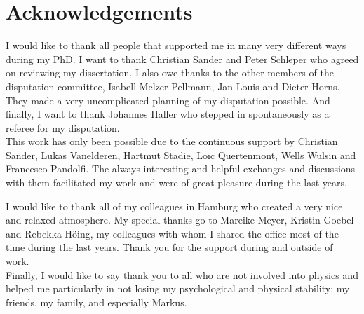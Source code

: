 \chapter*{Acknowledgements}
\vspace{1cm}

I would like to thank all people that supported me in many very different ways during my PhD.
I want to thank Christian Sander and Peter Schleper who agreed on reviewing my dissertation.
I also owe thanks to the other members of the disputation committee, Isabell Melzer-Pellmann, Jan Louis and Dieter Horns.
They made a very uncomplicated planning of my disputation possible.
And finally, I want to thank Johannes Haller who stepped in spontaneously as a referee for my disputation.\\

This work has only been possible due to the continuous support by Christian Sander, Lukas Vanelderen, Hartmut Stadie, Lo\"{i}c Quertenmont, Wells Wulsin and Francesco Pandolfi.
The always interesting and helpful exchanges and discussions with them facilitated my work and were of great pleasure during the last years.

I would like to thank all of my colleagues in Hamburg who created a very nice and relaxed atmosphere. 
My special thanks go to Mareike Meyer, Kristin Goebel and Rebekka H\"{o}ing, my colleagues with whom I shared the office most of the time during the last years. 
Thank you for the support during and outside of work.\\

Finally, I would like to say thank you to all who are not involved into physics and helped me particularly in not losing my psychological and physical stability: my friends, my family, and especially Markus.
